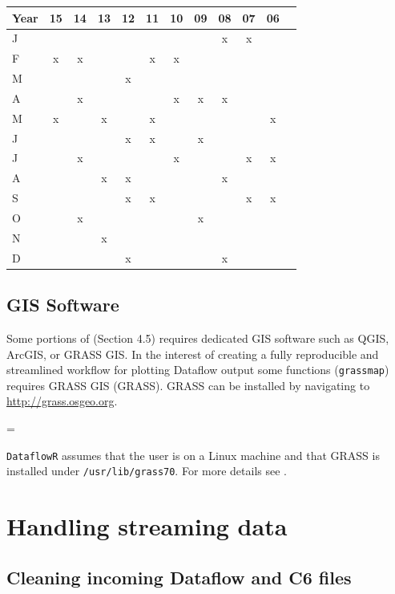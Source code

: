 \documentclass[12pt]{article}
\newenvironment{warning}
{\par\begin{mdframed}[linewidth=2pt,linecolor=red]
\begin{list}{}{\leftmargin=1cm
  \labelwidth=\leftmargin}\item[\Large\ding{43}]}
{\end{list}\end{mdframed}\par}
\begin{document}
\begin{center}
\begin{tabular}{l*{10} {c} r}
\hline
Year & 15 & 14 & 13 & 12 & 11 & 10 & 09 & 08 & 07 & 06\\ \hline
J &  &  &  &  &  &  &  & x & x & \\
F & x & x &  &  & x & x &  &  &  & \\
M &  &  &  & x &  &  &  &  &  & \\
A &  & x &  &  &  & x & x & x &  & \\
M & x &  & x &  & x &  &  &  &  & x \\
J &  &  &  & x & x &  & x &  &  & \\
J &  & x &  &  &  & x &  &  & x & x \\
A &  &  & x & x &  &  &  & x &  & \\
S &  &  &  & x & x &  &  &  & x & x \\
O &  & x &  &  &  &  & x &  &  & \\
N &  &  & x &  &  &  &  &  &  & \\
D &  &  &  & x &  &  &  & x &  & \\
\hline
\end{tabular}
\end{center}

\subsection{GIS Software}
Some portions of  (Section 4.5) requires dedicated GIS software such as QGIS, ArcGIS, or GRASS GIS. In the interest of creating a fully reproducible and streamlined workflow for plotting Dataflow output some functions (\texttt{grassmap}) requires GRASS GIS (GRASS). GRASS can be installed by navigating to \href{http://grass.osgeo.org}{http://grass.osgeo.org}.

\vspace{15pt}
\begin{warning}
\texttt{DataflowR} assumes that the user is on a Linux machine and that GRASS is installed under \texttt{/usr/lib/grass70}. For more details see \citet{rgrass7}.
\end{warning}

\section{Handling streaming data}
\subsection{Cleaning incoming Dataflow and C6 files}
\end{document}
